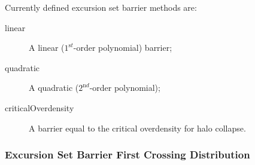 Currently defined excursion set barrier methods are:
\begin{description}
 \item [{\normalfont \ttfamily linear}] A linear ($1^{\mathrm st}$-order polynomial) barrier;
  \item [{\normalfont \ttfamily quadratic}] A quadratic ($2^{\mathrm nd}$-order polynomial);
  \item [{\normalfont \ttfamily criticalOverdensity}] A barrier equal to the critical overdensity for halo collapse.
\end{description}

\subsubsection{Excursion Set Barrier First Crossing Distribution}\label{sec:excursionSetFirstCrossingMethod}

